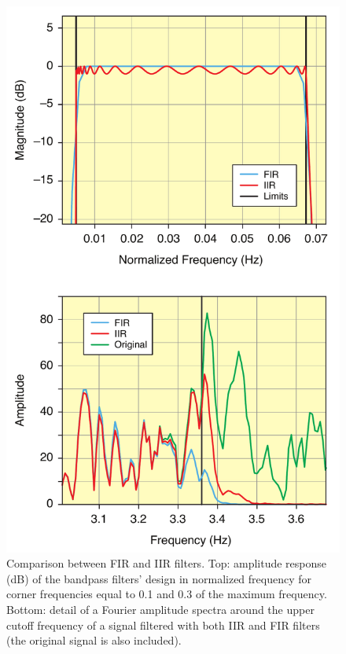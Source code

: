 \documentclass{article}
\begin{document}
\begin{figure} [H]
\begin{center}  
\includegraphics[scale=0.4]{figures/pdf/figure3.pdf} 
\caption{Comparison between FIR and IIR filters. Top: amplitude response (dB) of the bandpass filters' design in normalized frequency for corner frequencies equal to 0.1 and 0.3 of the maximum frequency. Bottom:
detail of a Fourier amplitude spectra around the upper cutoff frequency of a signal filtered with both IIR and FIR filters (the original signal is also included).
}
\end{center}   
\end{figure}
\end{document}
